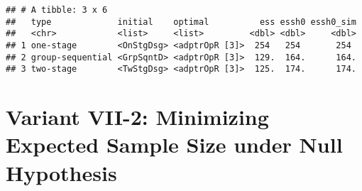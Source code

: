 \documentclass[
]{book}
\newenvironment{Shaded}{\begin{snugshade}}{\end{snugshade}}
\newcommand{\AttributeTok}[1]{\textcolor[rgb]{0.77,0.63,0.00}{#1}}
\newcommand{\CommentTok}[1]{\textcolor[rgb]{0.56,0.35,0.01}{\textit{#1}}}
\newcommand{\DecValTok}[1]{\textcolor[rgb]{0.00,0.00,0.81}{#1}}
\newcommand{\FunctionTok}[1]{\textcolor[rgb]{0.00,0.00,0.00}{#1}}
\newcommand{\NormalTok}[1]{#1}
\newcommand{\OtherTok}[1]{\textcolor[rgb]{0.56,0.35,0.01}{#1}}
\newcommand{\SpecialCharTok}[1]{\textcolor[rgb]{0.00,0.00,0.00}{#1}}
\begin{document}
\begin{Shaded}
\end{Shaded}

\begin{verbatim}
## # A tibble: 3 x 6
##   type             initial    optimal          ess essh0 essh0_sim
##   <chr>            <list>     <list>         <dbl> <dbl>     <dbl>
## 1 one-stage        <OnStgDsg> <adptrOpR [3]>  254   254       254 
## 2 group-sequential <GrpSqntD> <adptrOpR [3]>  129.  164.      164.
## 3 two-stage        <TwStgDsg> <adptrOpR [3]>  125.  174.      174.
\end{verbatim}

\hypertarget{variant-vii-2-minimizing-expected-sample-size-under-null-hypothesis}{%
\section{Variant VII-2: Minimizing Expected Sample Size under Null Hypothesis}\label{variant-vii-2-minimizing-expected-sample-size-under-null-hypothesis}}
\end{document}
